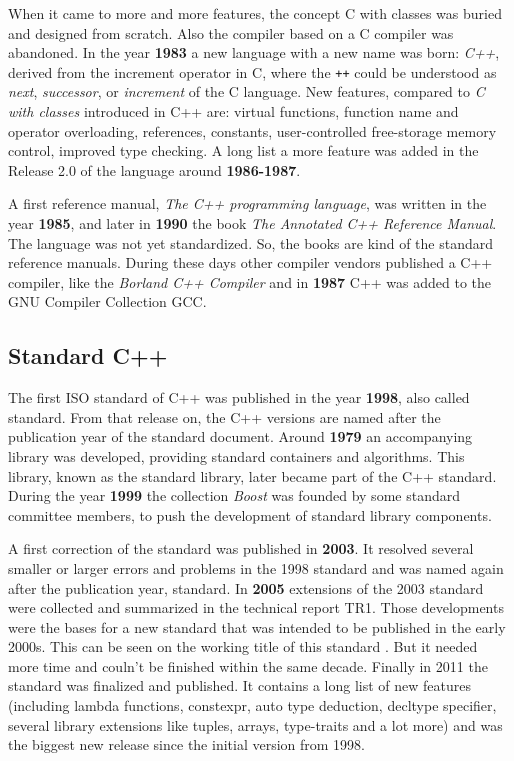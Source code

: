 When it came to more and more features, the concept C with classes was buried and designed from scratch. Also the compiler based on a C compiler
was abandoned. In the year \textbf{1983} a new language with a new name was born: \textit{C++}, derived from the increment operator in C,
where the \texttt{++} could be understood as \emph{next}, \emph{successor}, or \emph{increment} of the C language. New features, compared
to \emph{C with classes} introduced in C++ are: virtual functions, function name and operator overloading, references, constants,
user-controlled free-storage memory control, improved type checking. A long list a more feature was added in the Release 2.0 of the language
around \textbf{1986-1987}.

A first reference manual, \textit{The C++ programming language}, was written in the year \textbf{1985}, and later in \textbf{1990} the book
\textit{The Annotated C++ Reference Manual}. The language was not yet standardized. So, the books are kind of the standard reference manuals.
During these days other compiler vendors published a C++ compiler, like  the \textit{Borland C++ Compiler} and in \textbf{1987} C++ was added
to the GNU Compiler Collection GCC.

\subsection{Standard C++}
The first ISO standard of C++ was published in the year \textbf{1998}, also called  standard. From that release on, the C++ versions are
named after the publication year of the standard document. Around \textbf{1979} an accompanying library was developed, providing standard
containers and algorithms. This library, known as the standard library, later became part of the C++ standard. During the year \textbf{1999}
the collection \emph{Boost} was founded by some standard committee members, to push the development of standard library components.

A first correction of the  standard was published in \textbf{2003}. It resolved several smaller or larger errors and problems in the
1998 standard and was named again after the publication year,  standard. In \textbf{2005} extensions of the 2003 standard were collected
and summarized in the technical report TR1. Those developments were the bases for a new standard that was intended to be published in the
early 2000s. This can be seen on the working title of this standard . But it needed more time and couln't be finished within the same
decade. Finally in 2011 the standard  was finalized and published. It contains a long list of new features (including lambda functions,
constexpr, auto type deduction, decltype specifier, several library extensions like tuples, arrays, type-traits and a lot more) and was the
biggest new release since the initial version from 1998.

